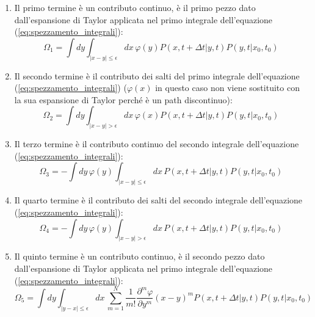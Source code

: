 \begin{enumerate}
    \item Il primo termine è un contributo continuo, è il primo pezzo dato dall'espansione di Taylor applicata nel primo integrale dell'equazione (\ref{eq:spezzamento_integrali}):
\begin{equation}
\Omega_1 = \int dy \int_{|x-y| \le \epsilon} dx \, \varphi(y) P(x, t+\Delta t | y, t) P(y, t | x_0, t_0)
\end{equation}
\item Il secondo termine è il contributo dei salti del primo integrale dell'equazione (\ref{eq:spezzamento_integrali}) ($\varphi (x)$ in questo caso non viene sostituito con la sua espansione di Taylor perché è un path discontinuo):
\begin{equation}
\Omega_2 = \int dy \int_{|x-y| > \epsilon} dx \, \varphi(x) P(x, t+\Delta t | y, t) P(y, t | x_0, t_0)
\end{equation}

\item Il terzo termine è il contributo continuo del secondo integrale dell'equazione (\ref{eq:spezzamento_integrali}):
\begin{equation}
\Omega_3 = - \int dy \, \varphi(y) \int_{|x-y| \le \epsilon} dx \, P(x, t+\Delta t | y, t) P(y, t | x_0, t_0)
\end{equation}

\item Il quarto termine è il contributo dei salti del secondo integrale dell'equazione (\ref{eq:spezzamento_integrali}):
\begin{equation}
\Omega_4 = - \int dy \, \varphi(y) \int_{|x-y| > \epsilon} dx \, P(x, t+\Delta t | y, t) P(y, t | x_0, t_0)
\end{equation}

\item Il quinto termine è un contributo continuo, è il secondo pezzo dato dall'espansione di Taylor applicata nel primo integrale dell'equazione (\ref{eq:spezzamento_integrali}):
\begin{equation}
\Omega_5 = \int dy \int_{|y-x| \le \epsilon} dx \, \sum_{m=1}^{N} \frac{1}{m!} \frac{\partial^m \varphi}{\partial y^m} (x-y)^m P(x,t+\Delta t|y,t)P(y,t|x_0,t_0)
\label{eq:omega5_def}
\end{equation}

\end{enumerate}

